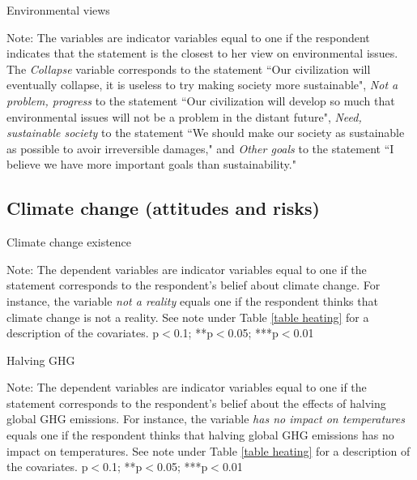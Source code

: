 \documentclass{article}
\begin{document}
\begin{table}[h!]
	\caption{Environmental views}
	\begin{center}
		\scalebox{0.7}{}
	\end{center}
	{\footnotesize Note: The variables are indicator variables equal to one if the respondent indicates that the statement is the closest to her view on environmental issues. The \textit{Collapse} variable corresponds to the statement ``Our civilization will eventually collapse, it is useless to try making society more sustainable", \textit{Not a problem, progress} to the statement ``Our civilization will develop so much that environmental issues will not be a problem in the distant future", \textit{Need, sustainable society} to the statement ``We should make our society as sustainable as possible to avoir irreversible damages," and \textit{Other goals} to the statement ``I believe we have more important goals than sustainability."}
\end{table}	

\clearpage
\subsection{Climate change (attitudes and risks)}


\begin{table}[h!]
	\caption{Climate change existence}
	\begin{center}
		\scalebox{0.7}{}
	\end{center}
	{\footnotesize Note: The dependent variables are indicator variables equal to one if the statement corresponds to the respondent's belief about climate change. For instance, the variable \textit{not a reality} equals one if the respondent thinks that climate change is not a reality. See note under Table \ref{table heating} for a description of the covariates.
	\newline *p$<$0.1; **p$<$0.05; ***p$<$0.01}
\end{table}		

\begin{table}[h!]
	\caption{Halving GHG}
	\begin{center}
		\scalebox{0.7}{}
	\end{center}
	{\footnotesize Note: The dependent variables are indicator variables equal to one if the statement corresponds to the respondent's belief about the effects of halving global GHG emissions. For instance, the variable \textit{has no impact on temperatures} equals one if the respondent thinks that halving global GHG emissions has no impact on temperatures. See note under Table \ref{table heating} for a description of the covariates.
	\newline *p$<$0.1; **p$<$0.05; ***p$<$0.01}
\end{table}
\end{document}
